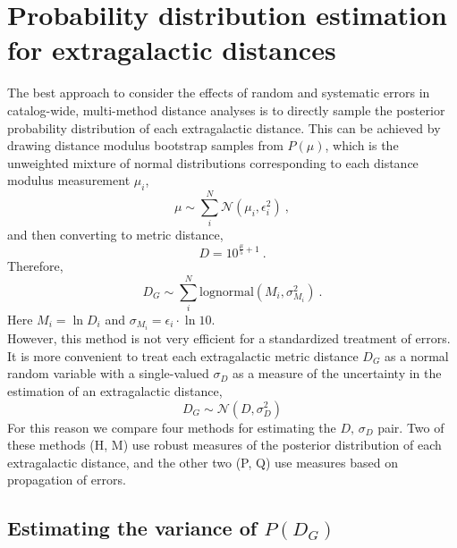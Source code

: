 \documentclass[a4paper,fleqn,usenatbib]{mnras}
\begin{document}
\section{Probability distribution estimation for extragalactic distances}
\label{sec:post} 
 
The best approach to consider the effects of random and systematic errors in catalog-wide, multi-method distance analyses is to directly sample the posterior probability distribution of each extragalactic distance. This can be achieved by drawing distance modulus bootstrap samples from $P(\mu)$, which is the unweighted mixture of normal distributions corresponding to each distance modulus measurement $\mu_i$,
\[\mu\sim\sum_i^N \mathcal{N}(\mu_i,\epsilon_i^2)\ ,\]
and then converting to metric distance,
\[D=10^{\frac{\mu}{5}+1}\ .\]
Therefore,
\[D_G\sim\sum_i^N\mathrm{lognormal}(M_i,\sigma_{M_i}^2)\ .\]
Here $M_i=\ln D_i$ and $\sigma_{M_i}=\epsilon_i\cdot\ln10$.\\

However, this method is not very efficient for a standardized treatment of errors. It is more convenient to treat each extragalactic metric distance $D_G$ as a normal random variable with a single-valued $\sigma_D$ as a measure of the uncertainty in the estimation of an extragalactic distance,
\[D_G\sim \mathcal{N}(D,\sigma_D^2)\]
For this reason we compare four methods for estimating the $D,\,\sigma_D$ pair. Two of these methods (H, M) use robust measures of the posterior distribution of each extragalactic distance, and the other two (P, Q) use measures based on propagation of errors.

\subsection{Estimating the variance of $P(D_G)$}
\label{sec:meth} 
\end{document}
